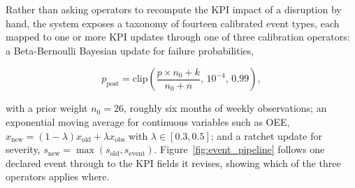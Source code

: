 Rather than asking operators to recompute the KPI impact of a disruption by hand, the system
exposes a taxonomy of fourteen calibrated event types, each mapped to one or more KPI
updates through one of three calibration operators: a Beta-Bernoulli Bayesian update for
failure probabilities,

\begin{equation}
    p_{\text{post}} = \text{clip}\!\left(\frac{p\times n_0 + k}{n_0+n},\, 10^{-4},\,
    0.99\right),
    \label{eq:bayes_update}
\end{equation}

with a prior weight $n_0 = 26$, roughly six months of weekly observations; an exponential
moving average for continuous variables such as OEE,
$x_{\text{new}} = (1-\lambda)x_{\text{old}} + \lambda x_{\text{obs}}$ with
$\lambda \in [0.3, 0.5]$; and a ratchet update for severity,
$s_{\text{new}} = \max(s_{\text{old}}, s_{\text{event}})$.
Figure~\ref{fig:event_pipeline} follows one declared event through to the KPI fields it
revises, showing which of the three operators applies where.

